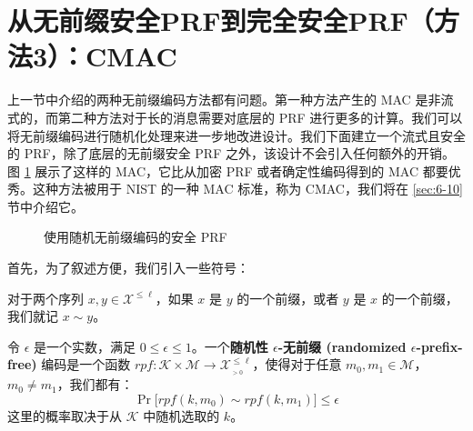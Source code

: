 \section{从无前缀安全PRF到完全安全PRF（方法3）：CMAC}\label{sec:6-7}

上一节中介绍的两种无前缀编码方法都有问题。第一种方法产生的 MAC 是非流式的，而第二种方法对于长的消息需要对底层的 PRF 进行更多的计算。我们可以将无前缀编码进行随机化处理来进一步地改进设计。我们下面建立一个流式且安全的 PRF，除了底层的无前缀安全 PRF 之外，该设计不会引入任何额外的开销。图 \ref{fig:6-6} 展示了这样的 MAC，它比从加密 PRF 或者确定性编码得到的 MAC 都要优秀。这种方法被用于 NIST 的一种 MAC 标准，称为 CMAC，我们将在 \ref{sec:6-10} 节中介绍它。

\begin{figure}
  \centering
  
  \caption{使用随机无前缀编码的安全 PRF}
  \label{fig:6-6}
\end{figure}

首先，为了叙述方便，我们引入一些符号：

\begin{definition}\label{def:6-5}
对于两个序列 $x,y\in\mathcal{X}^{\leq\ell}$，如果 $x$ 是 $y$ 的一个前缀，或者 $y$ 是 $x$ 的一个前缀，我们就记 $x\sim y$。
\end{definition}

\begin{definition}\label{def:6-6}
令 $\epsilon$ 是一个实数，满足 $0\leq\epsilon\leq1$。一个\textbf{随机性 $\epsilon$-无前缀 (randomized $\epsilon$-prefix-free)} 编码是一个函数 $rpf:\mathcal{K}\times\mathcal{M}\to\mathcal{X}^{\leq\ell}_{_{>0}}$，使得对于任意 $m_0,m_1\in\mathcal{M}$，$m_0\neq m_1$，我们都有：
\[
\Pr\big[rpf(k,m_0)\sim rpf(k,m_1)\big]\leq\epsilon
\]
这里的概率取决于从 $\mathcal{K}$ 中随机选取的 $k$。
\end{definition}

